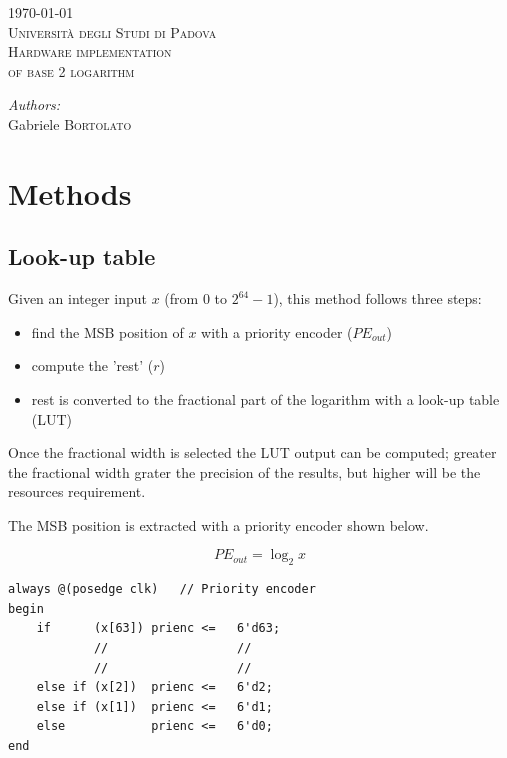 \documentclass[12pt]{article}
\begin{document}
\begin{titlepage}

\center 

{\large \today}\\[2cm] 

\textsc{\LARGE Università degli Studi di Padova}\\[1.5cm]


\textsc{\Large Hardware implementation \\ of base 2 logarithm}\\[0.5cm] 


\begin{minipage}{0.4\textwidth}
\large
\emph{Authors:} \\
Gabriele \textsc{Bortolato} \\
\end{minipage}

\vfill 

\end{titlepage}

\section{Methods}
\subsection{Look-up table}
Given an integer input $x$ (from $0$ to $2^{64}-1$), this method follows three steps:
\begin{itemize}
    \item find the MSB position of $x$ with a priority encoder ($PE_{out}$) 
    \item compute the 'rest' ($r$)
    \item rest is converted to the fractional part of the logarithm with a look-up table (LUT) 
\end{itemize}
Once the fractional width is selected the LUT output can be computed; greater the fractional width grater the precision of the results, but higher will be the resources requirement.  

The MSB position is extracted with a priority encoder shown below. 

\begin{equation}
    PE_{out} = \log_2{x}
\end{equation}

\begin{lstlisting}[style={verilog-style}]
always @(posedge clk)   // Priority encoder
begin
    if      (x[63]) prienc <=   6'd63;
            //                  //
            //                  //
    else if (x[2])  prienc <=   6'd2;
    else if (x[1])  prienc <=   6'd1;
    else            prienc <=   6'd0;
end
\end{lstlisting}
\end{document}
